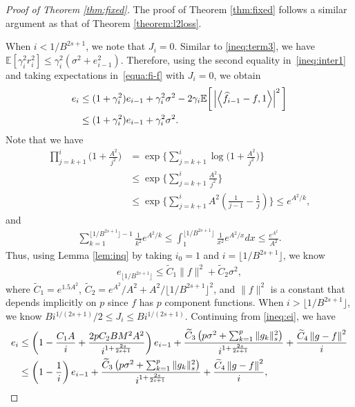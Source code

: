 \begin{proof}[Proof of Theorem \ref{thm:fixed}]
The proof of Theorem \ref{thm:fixed} follows a similar argument as that of Theorem \ref{theorem:l2loss}. 

When $i < 1/B^{2s+1}$, we note that $J_i = 0$. Similar to \eqref{ineq:term3}, we have $\mathbb{E}[\gamma_i^2r_i^2]\leq \gamma_i^2(\sigma^2+e_{i-1}^2)$. Therefore, using the second equality in~\eqref{ineq:inter1} and taking expectations in~\eqref{equa:fi-f} with $J_i = 0$, we obtain
\begin{align*}
    e_i &\leq (1+\gamma_i^2)e_{i-1} + \gamma_i^2\sigma^2 - 2\gamma_i \mathbb{E}\bigg[\left|\left\langle \widehat{f}_{i-1}-f,1 \right\rangle\right|^2\bigg] \\
    & \leq (1+\gamma_i^2)e_{i-1} + \gamma_i^2\sigma^2.
\end{align*}
Note that we have  
\begin{align*}
    \prod_{j=k+1}^i\Bigg(1+\frac{A^2}{j^2}\Bigg) &= \exp\Bigg\{\sum_{j=k+1}^i\log\Bigg(1+\frac{A^2}{j^2}\Bigg)\Bigg\}\\
    &\leq \exp\Bigg\{\sum_{j=k+1}^i\frac{A^2}{j^2}\Bigg\}\\
    &\leq \exp\Bigg\{\sum_{j=k+1}^iA^2\left(\frac{1}{j-1} - \frac{1}{j}\right)\Bigg\} \leq e^{A^2/k},
\end{align*}
and 
\begin{align*}
    \sum_{k=1}^{\lfloor 1/B^{2s+1} \rfloor-1} \frac{1}{k^2}e^{A^2/k} \leq \int_1^{\lfloor 1/B^{2s+1} \rfloor} \frac{1}{x^2}e^{A^2/x} dx \leq \frac{e^{A^2}}{A^2}.
\end{align*}
Thus, using Lemma \ref{lem:inq} by taking $i_0=1$ and $i = \lfloor 1/B^{2s+1} \rfloor$, we know
\begin{align}
    e_{\lfloor 1/B^{2s+1} \rfloor} \leq \tilde C_1\|f\|^2 + \tilde C_2 \sigma^2, \label{stage2:fixed}
\end{align}
where $\tilde C_1 = e^{1.5A^2}$, $\tilde C_2 = e^{A^2}/A^2 + A^2/\lfloor 1/B^{2s+1} \rfloor^2$, and $\|f\|^2$ is a constant that depends implicitly on $p$ since $f$ has $p$ component functions. When $i > \lfloor 1/B^{2s+1} \rfloor$, we know $Bi^{1/(2s+1)}/2 \leq J_i \leq Bi^{1/(2s+1)}$. Continuing from \eqref{ineq:ei}, we have
\begin{align*}
    e_i & \leq \left(1-\frac{C_1A}{i}+\frac{2pC_2BM^2A^2}{i^{1+\frac{2s}{2s+1}}}\right)e_{i-1}+ \frac{\tilde C_3\left(p\sigma^2+\sum_{k=1}^p\|g_k\|_s^2\right)}{i^{1+\frac{2s}{2s+1}}} + \frac{\tilde C_4 \normx{g-f}^2}{i}\\
    & \leq \left(1-\frac{1}{i}\right)e_{i-1}+ \frac{\tilde C_3\left(p\sigma^2+\sum_{k=1}^p\|g_k\|_s^2\right)}{i^{1+\frac{2s}{2s+1}}} + \frac{\tilde C_4 \normx{g-f}^2}{i},

\end{align*}
\end{proof}
